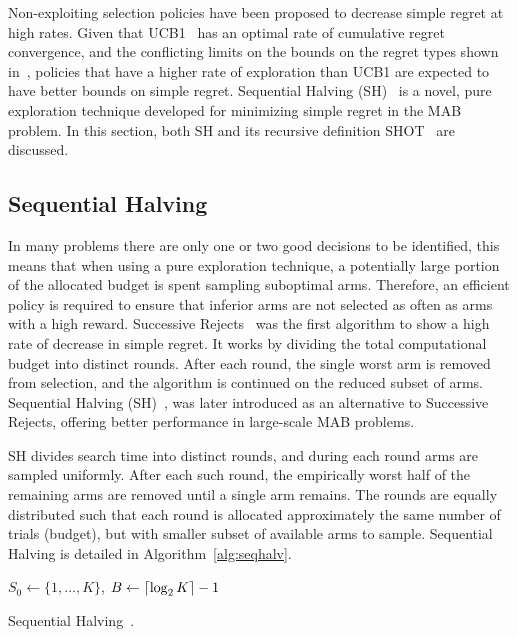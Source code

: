 \documentclass[a4paper]{llncs}
\DeclarePairedDelimiter{\ceil}{\lceil}{\rceil}
\DeclarePairedDelimiter{\floor}{\lfloor}{\rfloor}
\begin{document}
Non-exploiting selection policies have been proposed to decrease simple regret at high rates. Given that UCB1~\cite{auer2002using} has an optimal rate of cumulative regret convergence, and the conflicting limits on the bounds on the regret types shown in~\cite{Bubeck11Pure}, policies that have a higher rate of exploration than UCB1 are expected to have better bounds on simple regret. Sequential Halving (SH)~\cite{Karnin13SH} is a novel, pure exploration technique developed for minimizing simple regret in the MAB problem. In this section, both SH and its recursive definition SHOT~\cite{Cazenave14SHOT} are discussed.

\subsection{Sequential Halving}
\label{subsec:seq_halving}

In many problems there are only one or two good decisions to be identified, this means that when using a pure exploration technique, a potentially large portion of the allocated budget is spent sampling suboptimal arms. Therefore, an efficient policy is required to ensure that inferior arms are not selected as often as arms with a high reward. Successive Rejects~\cite{audibert2010best} was the first algorithm to show a high rate of decrease in simple regret. It works by dividing the total computational budget into distinct rounds. After each round, the single worst arm is removed from selection, and the algorithm is continued on the reduced subset of arms. Sequential Halving (SH)~\cite{Karnin13SH}, was later introduced as an alternative to Successive Rejects, offering better performance in large-scale MAB problems.

SH divides search time into distinct rounds, and during each round arms are sampled uniformly. After each such round, the empirically worst half of the remaining arms are removed until a single arm remains. The rounds are equally distributed such that each round is allocated approximately the same number of trials (budget), but with smaller subset of available arms to sample. Sequential Halving is detailed in Algorithm~\ref{alg:seqhalv}.

\IncMargin{1em}
\begin{algorithm2e}[t]
	\vspace{0.05cm}
	$S_0 \gets \{1,\dots,K\}$,
	$B \gets \ceil{\log_2{K}} - 1$														\;
	\BlankLine
  \caption[Sequential Halving]{Sequential Halving~\protect\cite{Karnin13SH}. \label{alg:seqhalv}}
\end{algorithm2e}
\DecMargin{1em}
\end{document}

